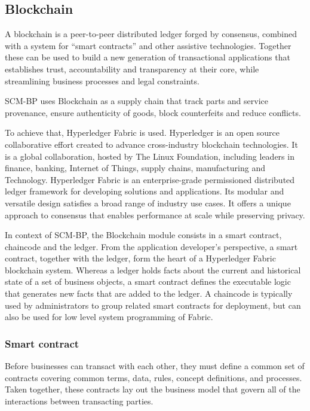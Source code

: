 \subsection{Blockchain}\label{sec:BlockchainModule}

A blockchain is a peer-to-peer distributed ledger forged by consensus, combined with a system for “smart contracts” and other assistive technologies. Together these can be used to build a new generation of transactional applications that establishes trust, accountability and transparency at their core, while streamlining business processes and legal constraints.

SCM-BP uses Blockchain as a supply chain that track parts and service provenance, ensure authenticity of goods, block counterfeits and reduce conflicts.

To achieve that, Hyperledger Fabric is used. Hyperledger is an open source collaborative effort created to advance cross-industry blockchain technologies. It is a global collaboration, hosted by The Linux Foundation, including leaders in finance, banking, Internet of Things, supply chains, manufacturing and Technology.
Hyperledger Fabric is an enterprise-grade permissioned distributed ledger framework for developing solutions and applications. Its modular and versatile design satisfies a broad range of industry use cases. It offers a unique approach to consensus that enables performance at scale while preserving privacy.

In context of SCM-BP, the Blockchain module consists in a smart contract, chaincode and the ledger. From the application developer’s perspective, a smart contract, together with the ledger, form the heart of a Hyperledger Fabric blockchain system. Whereas a ledger holds facts about the current and historical state of a set of business objects, a smart contract defines the executable logic that generates new facts that are added to the ledger. A chaincode is typically used by administrators to group related smart contracts for deployment, but can also be used for low level system programming of Fabric.

\subsubsection{Smart contract}
Before businesses can transact with each other, they must define a common set of contracts covering common terms, data, rules, concept definitions, and processes. Taken together, these contracts lay out the business model that govern all of the interactions between transacting parties.

